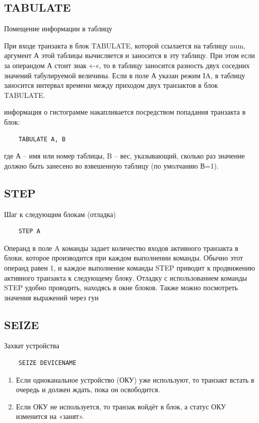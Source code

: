 \documentclass[14pt]{extarticle}
\begin{document}
\subsection*{TABULATE}

Помещение информации в таблицу

При входе транзакта в блок TABULATE, которой ссылается на таблицу num, аргумент А этой таблицы вычисляется и заносится в эту таблицу. При этом если за операндом А стоит знак «-«, то в таблицу заносится разность двух соседних значений табулируемой величины. Если в поле А указан режим IA, в таблицу заносится интервал времени между приходом двух транзактов в блок TABULATE.

информация о гистограмме накапливается посредством попадания транзакта в блок:

\begin{lstlisting}
	TABULATE A, B
\end{lstlisting}

где А – имя или номер таблицы, B – вес, указывающий, сколько раз значение должно быть занесено во взвешенную таблицу (по умолчанию В=1).


\subsection*{STEP}

Шаг к следующим блокам (отладка)

\begin{lstlisting}
	STEP A
\end{lstlisting}

Операнд в поле A команды задает количество входов активного транзакта в блоки, которое производится при каждом выполнении команды. Обычно этот операнд равен 1, и каждое выполнение команды STEP приводит к продвижению активного транзакта к следующему блоку. Отладку с использованием команды STEP удобно проводить, находясь в окне блоков. Также можно посмотреть значения выражений через гуи

\subsection*{SEIZE}

Захват устройства



\begin{lstlisting}
	SEIZE DEVICENAME
\end{lstlisting}

\begin{enumerate}
	\item Если одноканальное устройство (ОКУ) уже используют, то транзакт встать в очередь и должен ждать, пока он освободится.
	\item Если ОКУ не используется, то транзак войдёт в блок, а статус ОКУ изменится на «занят».
\end{enumerate}
\end{document}
